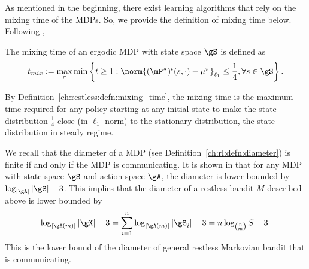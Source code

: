 As mentioned in the beginning, there exist learning algorithms that rely on the mixing time of the MDPs.
So, we provide the definition of mixing time below.
Following \cite[Definition 5.1]{wei2020model},
\begin{defn}
    \label{ch:restless:defn:mixing_time}
    The mixing time of an ergodic MDP with state space $\gS$ is defined as
    \begin{align*}
        t_{mix} := \max_{\pi}\min\left\{ t\ge1 : \norm{(\mP^\pi)^t(s,\cdot) - \mu^\pi}_{\ell_1} \le \frac14, \forall s\in\gS\right\}.
    \end{align*}
\end{defn}
By Definition~\ref{ch:restless:defn:mixing_time}, the mixing time is the maximum time required for any policy starting at any initial state to make the state distribution $\frac14$-close (in $\ell_1$ norm) to the stationary distribution, the state distribution in steady regime.

We recall that the diameter of a MDP (see Definition~\ref{ch:rl:defn:diameter}) is finite if and only if the MDP is communicating.
It is shown in \cite[Appendix A]{jaksch2010near} that for any MDP with state space $\gS$ and action space $\gA$, the diameter is lower bounded by $\log_{|\gA|}|\gS|-3$.
This implies that the diameter of a restless bandit $M$ described above is lower bounded by %
\begin{equation*}
    \log_{|\gA(m)|}|\gX| -3 = \sum_{i=1}^{n}\log_{|\gA(m)|}|\gS_i| -3 =n\log_{{n \choose m}}S -3.
\end{equation*}
This is the lower bound of the diameter of general restless Markovian bandit that is communicating.

%
%

